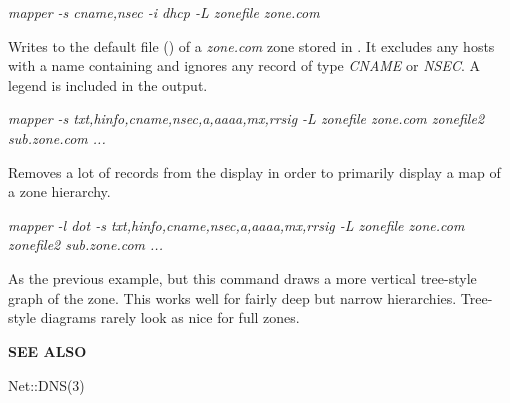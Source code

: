 \begin{description}

\item {\it mapper -s cname,nsec -i dhcp -L zonefile zone.com}\verb" "

Writes to the default file () of a {\it zone.com} zone
stored in .  It excludes any hosts with a name containing
 and ignores any record of type {\it CNAME} or {\it NSEC}.  A legend
is included in the output.

\item {\it mapper -s txt,hinfo,cname,nsec,a,aaaa,mx,rrsig -L zonefile zone.com zonefile2 sub.zone.com ...}\verb" "

Removes a lot of records from the display in order to primarily display
a map of a zone hierarchy.

\item {\it mapper -l dot -s txt,hinfo,cname,nsec,a,aaaa,mx,rrsig -L zonefile zone.com zonefile2 sub.zone.com ...}\verb" "

As the previous example, but this command draws a more vertical tree-style
graph of the zone.  This works well for fairly deep but narrow hierarchies.
Tree-style diagrams rarely look as nice for full zones.

\end{description}

{\bf SEE ALSO}

Net::DNS(3)

